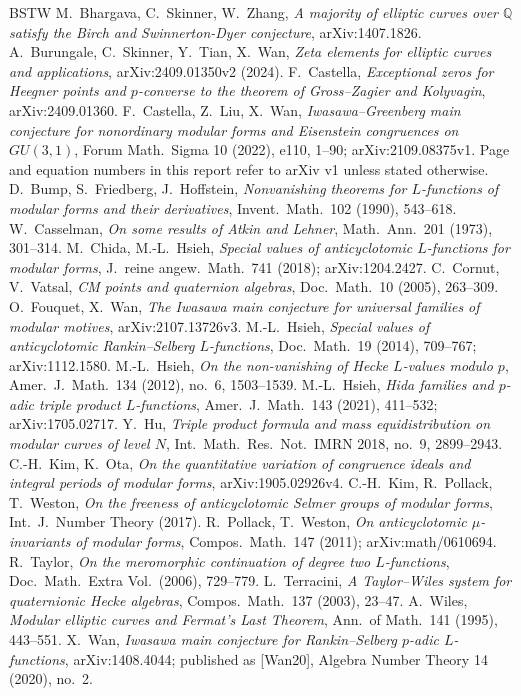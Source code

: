\documentclass[11pt]{amsart}
\theoremstyle{definition}
\theoremstyle{remark}
\newcommand{\Q}{\mathbb{Q}}
\begin{document}
\begin{thebibliography}{BSTW}
 M.~Bhargava, C.~Skinner, W.~Zhang, \emph{A majority of elliptic curves over $\Q$ satisfy the Birch and Swinnerton-Dyer conjecture}, arXiv:1407.1826.
 A.~Burungale, C.~Skinner, Y.~Tian, X.~Wan, \emph{Zeta elements for elliptic curves and applications}, arXiv:2409.01350v2 (2024).
 F.~Castella, \emph{Exceptional zeros for Heegner points and $p$-converse to the theorem of Gross--Zagier and Kolyvagin}, arXiv:2409.01360.
 F.~Castella, Z.~Liu, X.~Wan, \emph{Iwasawa--Greenberg main conjecture for nonordinary modular forms and Eisenstein congruences on $GU(3,1)$}, Forum Math.\ Sigma 10 (2022), e110, 1--90; arXiv:2109.08375v1. Page and equation numbers in this report refer to arXiv v1 unless stated otherwise.
 D.~Bump, S.~Friedberg, J.~Hoffstein, \emph{Nonvanishing theorems for $L$-functions of modular forms and their derivatives}, Invent.\ Math.\ 102 (1990), 543--618.
 W.~Casselman, \emph{On some results of Atkin and Lehner}, Math.\ Ann.\ 201 (1973), 301--314.
 M.~Chida, M.-L.~Hsieh, \emph{Special values of anticyclotomic $L$-functions for modular forms}, J.\ reine angew.\ Math.\ 741 (2018); arXiv:1204.2427.
 C.~Cornut, V.~Vatsal, \emph{CM points and quaternion algebras}, Doc.\ Math.\ 10 (2005), 263--309.
 O.~Fouquet, X.~Wan, \emph{The Iwasawa main conjecture for universal families of modular motives}, arXiv:2107.13726v3.
 M.-L.~Hsieh, \emph{Special values of anticyclotomic Rankin--Selberg $L$-functions}, Doc.\ Math.\ 19 (2014), 709--767; arXiv:1112.1580.
 M.-L.~Hsieh, \emph{On the non-vanishing of Hecke $L$-values modulo $p$}, Amer.\ J.\ Math.\ 134 (2012), no.~6, 1503--1539.
 M.-L.~Hsieh, \emph{Hida families and $p$-adic triple product $L$-functions}, Amer.\ J.\ Math.\ 143 (2021), 411--532; arXiv:1705.02717.
 Y.~Hu, \emph{Triple product formula and mass equidistribution on modular curves of level $N$}, Int.\ Math.\ Res.\ Not.\ IMRN 2018, no.~9, 2899--2943.
 C.-H.~Kim, K.~Ota, \emph{On the quantitative variation of congruence ideals and integral periods of modular forms}, arXiv:1905.02926v4.
 C.-H.~Kim, R.~Pollack, T.~Weston, \emph{On the freeness of anticyclotomic Selmer groups of modular forms}, Int.\ J.\ Number Theory (2017).
 R.~Pollack, T.~Weston, \emph{On anticyclotomic $\mu$-invariants of modular forms}, Compos.\ Math.\ 147 (2011); arXiv:math/0610694.
 R.~Taylor, \emph{On the meromorphic continuation of degree two $L$-functions}, Doc.\ Math.\ Extra Vol.\ (2006), 729--779.
 L.~Terracini, \emph{A Taylor--Wiles system for quaternionic Hecke algebras}, Compos.\ Math.\ 137 (2003), 23--47.
 A.~Wiles, \emph{Modular elliptic curves and Fermat's Last Theorem}, Ann.\ of Math.\ 141 (1995), 443--551.
 X.~Wan, \emph{Iwasawa main conjecture for Rankin--Selberg $p$-adic $L$-functions}, arXiv:1408.4044; published as [Wan20], Algebra Number Theory 14 (2020), no.~2.
\end{thebibliography}
\end{document}
